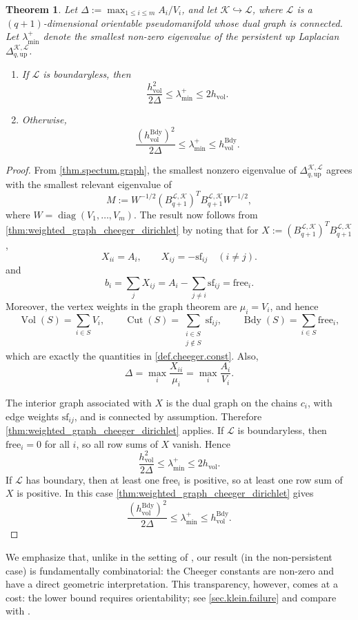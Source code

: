 \documentclass{article}
\newtheorem{theorem}{Theorem}[section]
\newcommand{\KK}{\mathcal{K}}
\newcommand{\LL}{\mathcal{L}}
\begin{document}
\begin{theorem}
\label{thm.pers.cheeger}
Let \(\Delta:=\max_{1\leq i\leq m} A_i/V_i\), and let \(\KK\hookrightarrow\LL\), where \(\LL\) is a \((q+1)\)-dimensional orientable pseudomanifold whose dual graph is connected. Let \(\lambda_{\min}^+\) denote the smallest non-zero eigenvalue of
the persistent up Laplacian \(\Delta_{q,\mathrm{up}}^{\KK,\LL}\). 
\begin{enumerate}
    \item If \(\LL\) is boundaryless, then
    \[
    \frac{h_{\mathrm{vol}}^2}{2\Delta}\leq \lambda_{\min}^+\leq 2h_{\mathrm{vol}}.
    \]
    \item Otherwise,
    \[
    \frac{(h^{\mathrm{Bdy}}_{\mathrm{vol}})^2}{2\Delta}\leq \lambda_{\min}^+\leq h^{\mathrm{Bdy}}_{\mathrm{vol}}.
    \]
\end{enumerate}
\end{theorem}
\begin{proof}
From \cref{thm.spectum.graph}, the smallest nonzero eigenvalue of \(\Delta_{q,\mathrm{up}}^{\KK,\LL}\) agrees with the smallest relevant eigenvalue of
\[
M:=W^{-1/2}(B_{q+1}^{\LL,\KK})^TB_{q+1}^{\LL,\KK}W^{-1/2},
\]
where \(W=\operatorname{diag}(V_1,\ldots,V_m)\). The result now follows from \cref{thm:weighted_graph_cheeger_dirichlet} by noting that for $X:=(B_{q+1}^{\LL,\KK})^TB_{q+1}^{\LL,\KK}$,
\[
X_{ii}=A_i,\qquad X_{ij}=-\mathrm{sf}_{ij}\quad (i\neq j).
\]
and
\[
b_i=\sum_jX_{ij}=A_i-\sum_{j\neq i}\mathrm{sf}_{ij}=\mathrm{free}_i.
\]
Moreover, the vertex weights in the graph theorem are \(\mu_i=V_i\), and hence
\[
\operatorname{Vol}(S)=\sum_{i\in S}V_i,\qquad
\operatorname{Cut}(S)=\sum_{\substack{i\in S\\j\notin S}}\mathrm{sf}_{ij},\qquad
\operatorname{Bdy}(S)=\sum_{i\in S}\mathrm{free}_i,
\]
which are exactly the quantities in \cref{def.cheeger.const}. Also,
\[
\Delta=\max_i\frac{X_{ii}}{\mu_i}=\max_i\frac{A_i}{V_i}.
\]

The interior graph associated with \(X\) is the dual graph on the chains \(c_i\), with edge weights \(\mathrm{sf}_{ij}\), and is connected by assumption. Therefore \cref{thm:weighted_graph_cheeger_dirichlet} applies. If \(\LL\) is boundaryless, then \(\mathrm{free}_i=0\) for all \(i\), so all row sums of \(X\) vanish. Hence
\[
\frac{h_{\mathrm{vol}}^2}{2\Delta}\leq \lambda_{\min}^+\leq 2h_{\mathrm{vol}}.
\]
If \(\LL\) has boundary, then at least one \(\mathrm{free}_i\) is positive, so at least one row sum of \(X\) is positive. In this case \cref{thm:weighted_graph_cheeger_dirichlet} gives
\[
\frac{(h_{\mathrm{vol}}^{\mathrm{Bdy}})^2}{2\Delta}\leq \lambda_{\min}^+\leq h_{\mathrm{vol}}^{\mathrm{Bdy}}.
\]
\end{proof}
We emphasize that, unlike in the setting of
\cite{MR3194207}, our result (in the non-persistent case) is
fundamentally combinatorial: the Cheeger constants are non-zero and have a
direct geometric interpretation.  This transparency, however, comes at a cost:
the lower bound requires orientability; see \cref{sec.klein.failure} and
compare with \cite[Theorem~2.7\,(2)]{MR3194207}.
\end{document}
